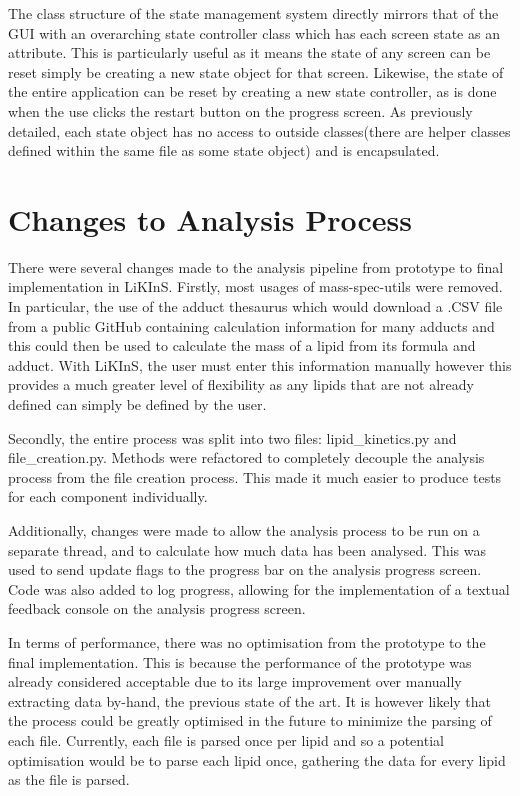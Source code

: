 \documentclass{l4proj}
\begin{document}
The class structure of the state management system directly mirrors that of the GUI with an overarching state controller class which has each screen state as an attribute. This is particularly useful as it means the state of any screen can be reset simply be creating a new state object for that screen. Likewise, the state of the entire application can be reset by creating a new state controller, as is done when the use clicks the restart button on the progress screen. As previously detailed, each state object has no access to outside classes(there are helper classes defined within the same file as some state object) and is encapsulated.

\section{Changes to Analysis Process}
There were several changes made to the analysis pipeline from prototype to final implementation in LiKInS. Firstly, most usages of mass-spec-utils were removed. In particular, the use of the adduct thesaurus which would download a .CSV file from a public GitHub containing calculation information for many adducts and this could then be used to calculate the mass of a lipid from its formula and adduct. With LiKInS, the user must enter this information manually however this provides a much greater level of flexibility as any lipids that are not already defined can simply be defined by the user.

Secondly, the entire process was split into two files: lipid\_kinetics.py and file\_creation.py. Methods were refactored to completely decouple the analysis process from the file creation process. This made it much easier to produce tests for each component individually.

Additionally, changes were made to allow the analysis process to be run on a separate thread, and to calculate how much data has been analysed. This was used to send update flags to the progress bar on the analysis progress screen. Code was also added to log progress, allowing for the implementation of a textual feedback console on the analysis progress screen.

In terms of performance, there was no optimisation from the prototype to the final implementation. This is because the performance of the prototype was already considered acceptable due to its large improvement over manually extracting data by-hand, the previous state of the art. It is however likely that the process could be greatly optimised in the future to minimize the parsing of each file. Currently, each file is parsed once per lipid and so a potential optimisation would be to parse each lipid once, gathering the data for every lipid as the file is parsed.
\end{document}
